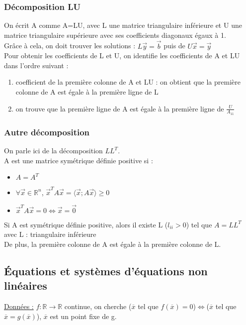 \documentclass[../main.tex]{subfiles}
\begin{document}
\subsubsection{Décomposition LU}
On écrit A comme A=LU, avec L une matrice triangulaire inférieure et U une matrice triangulaire supérieure avec ses coefficients diagonaux égaux à 1.\\

Grâce à cela, on doit trouver les solutions : $L\Vec{y} = \Vec{b}$ puis de $U\Vec{x} = \Vec{y}$\\

Pour obtenir les coefficients de L et U, on identifie les coefficients de A et LU dans l'ordre suivant :\\
\begin{enumerate}
    \item coefficient de la première colonne de A et LU : on obtient que la première colonne de A est égale à la première ligne de L\\
    \item on trouve que la première ligne de A est égale à la première ligne de $\frac{U}{A_{11}}$\\
\end{enumerate}


\subsubsection{Autre décomposition}
On parle ici de la décomposition $LL^T$.\\
A est une matrice symétrique définie positive si :\\
\begin{itemize}
    \item $A=A^T$\\
    \item $\forall \Vec{x} \in \mathbb{R}^n$, $\Vec{x}^TA\Vec{x} = \langle \Vec{x}; A\Vec{x}\rangle \geq 0$\\
    \item $\Vec{x}^T A \Vec{x} = 0 \Leftrightarrow \Vec{x} = \Vec{0}$\\
\end{itemize}
Si A est symétrique définie positive, alors il existe L ($l_{ii} > 0$) tel que $A=LL^T$ avec L : triangulaire inférieure\\
De plus, la première colonne de A est égale à la première colonne de L.\\

\subsection{Équations et systèmes d'équations non linéaires}
\quad \underline{Données :} $f:\mathbb{R} \rightarrow \mathbb{R}$ continue, on cherche ($\overline{x}$ tel que $f(\overline{x})=0$)$\Leftrightarrow$($\overline{x}$ tel que $\overline{x}=g(\overline{x})$), $\overline{x}$ est un point fixe de g.\\
\end{document}
